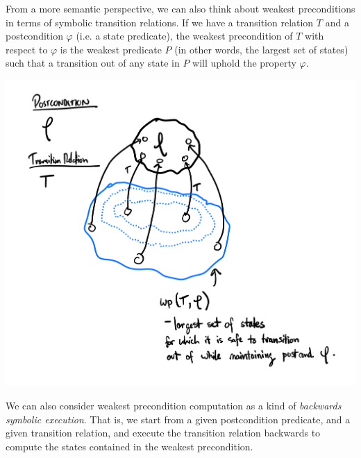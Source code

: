 \documentclass[10pt,a4paper]{article}
\begin{document}
From a more semantic perspective, we can also think about weakest preconditions in terms of symbolic transition relations. If we have a transition relation $T$ and a postcondition $\varphi$ (i.e. a state predicate), the weakest precondition of $T$ with respect to $\varphi$ is the weakest predicate $P$ (in other words, the largest set of states) such that a transition out of any state in $P$ will uphold the property $\varphi$.
\begin{center}
    \includegraphics[scale=0.18]{weakest_precond.png}
\end{center}
We can also consider weakest precondition computation as a kind of \textit{backwards symbolic execution}. That is, we start from a given postcondition predicate, and a given transition relation, and execute the transition relation backwards to compute the states contained in the weakest precondition.




\end{document}
